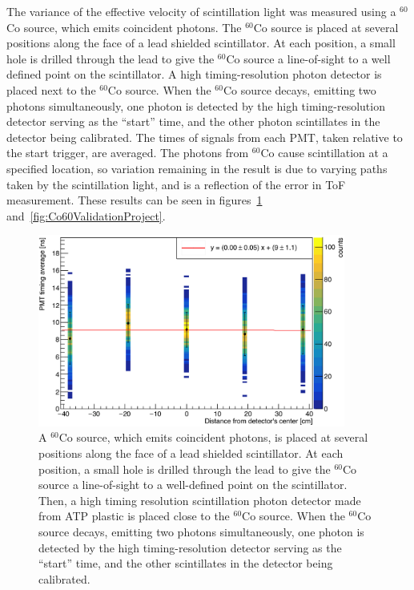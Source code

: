 The variance of the effective velocity of scintillation light was measured using a $^{60}$Co source, which emits coincident photons.
The $^{60}$Co source is placed at several positions along the face of a lead shielded scintillator.
At each position, a small hole is drilled through the lead to give the $^{60}$Co source a line-of-sight to a well defined point on the scintillator.
A high timing-resolution photon detector is placed next to the $^{60}$Co source.
When the $^{60}$Co source decays, emitting two photons simultaneously, one photon is detected by the high timing-resolution detector serving as the ``start'' time, and the other photon scintillates in the detector being calibrated.
The times of signals from each PMT, taken relative to the start trigger, are averaged.
The photons from $^{60}$Co cause scintillation at a specified location, so variation remaining in the result is due to varying paths taken by the scintillation light, and is a reflection of the error in ToF measurement.
These results can be seen in figures~\ref{fig:Co60Validation} and~\ref{fig:Co60ValidationProject}.
\begin{figure}[]
    \centering
    \includegraphics[width = 0.9\textwidth]{Content/Methods/CO60Validation.png}
    \caption{A $^{60}$Co source, which emits coincident photons, is placed at several positions along the face of a lead shielded scintillator.
    At each position, a small hole is drilled through the lead to give the $^{60}$Co source a line-of-sight to a well-defined point on the scintillator.
    Then, a high timing resolution scintillation photon detector made from ATP plastic is placed close to the $^{60}$Co source.
    When the $^{60}$Co source decays, emitting two photons simultaneously, one photon is detected by the high timing-resolution detector serving as the ``start'' time, and the other scintillates in the detector being calibrated.}
    \label{fig:Co60Validation}
\end{figure}
